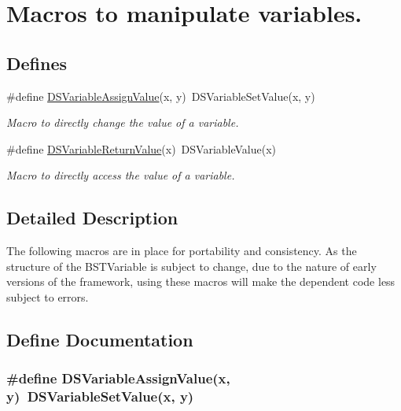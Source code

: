 \hypertarget{group___d_s___v_a_r_i_a_b_l_e___a_c_c_e_s_s_o_r_y}{
\section{Macros to manipulate variables.}
\label{group___d_s___v_a_r_i_a_b_l_e___a_c_c_e_s_s_o_r_y}
}
\subsection*{Defines}
\begin{DoxyCompactItemize}
\item 
\#define \hyperlink{group___d_s___v_a_r_i_a_b_l_e___a_c_c_e_s_s_o_r_y_ga3e1730e26b5f44a34e64d7996233d023}{DSVariableAssignValue}(x, y)~DSVariableSetValue(x, y)
\begin{DoxyCompactList}\small\item\em Macro to directly change the value of a variable. \item\end{DoxyCompactList}\item 
\#define \hyperlink{group___d_s___v_a_r_i_a_b_l_e___a_c_c_e_s_s_o_r_y_ga912df8d84202953a573824aebcf2498f}{DSVariableReturnValue}(x)~DSVariableValue(x)
\begin{DoxyCompactList}\small\item\em Macro to directly access the value of a variable. \item\end{DoxyCompactList}\end{DoxyCompactItemize}


\subsection{Detailed Description}
The following macros are in place for portability and consistency. As the structure of the BSTVariable is subject to change, due to the nature of early versions of the framework, using these macros will make the dependent code less subject to errors. 

\subsection{Define Documentation}
\hypertarget{group___d_s___v_a_r_i_a_b_l_e___a_c_c_e_s_s_o_r_y_ga3e1730e26b5f44a34e64d7996233d023}{
\subsubsection[{DSVariableAssignValue}]{\setlength{\rightskip}{0pt plus 5cm}\#define DSVariableAssignValue(x, \/  y)~DSVariableSetValue(x, y)}}
\label{group___d_s___v_a_r_i_a_b_l_e___a_c_c_e_s_s_o_r_y_ga3e1730e26b5f44a34e64d7996233d023}


